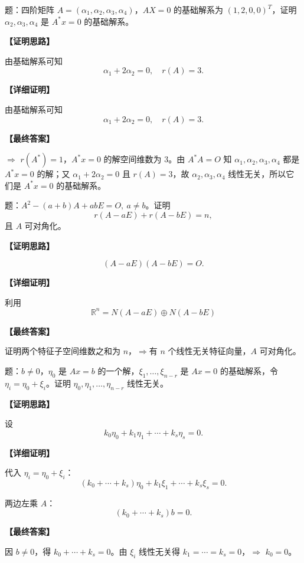 ﻿\documentclass[11pt,a4paper,UTF8]{ctexart}
\begin{document}
\begin{answerbox}
题：四阶矩阵 $A=(\alpha_1,\alpha_2,\alpha_3,\alpha_4)$，$AX=0$ 的基础解系为 $(1,2,0,0)^T$，证明 $\alpha_2,\alpha_3,\alpha_4$ 是 $A^*x=0$ 的基础解系。

\textbf{【证明思路】}

由基础解系可知
\[\alpha_1+2\alpha_2=0,\quad r(A)=3.\]

\textbf{【详细证明】}

由基础解系可知
\[\alpha_1+2\alpha_2=0,\quad r(A)=3.\]

\textbf{【最终答案】}

$\Rightarrow$ $r(A^*)=1$，$A^*x=0$ 的解空间维数为 $3$。由 \(A^*A=O\) 知 \(\alpha_1,\alpha_2,\alpha_3,\alpha_4\) 都是 \(A^*x=0\) 的解；又 \(\alpha_1+2\alpha_2=0\) 且 \(r(A)=3\)，故 \(\alpha_2,\alpha_3,\alpha_4\) 线性无关，所以它们是 \(A^*x=0\) 的基础解系。
\end{answerbox}
\begin{answerbox}
题：$A^2-(a+b)A+abE=O,\ a\ne b$。证明
\[r(A-aE)+r(A-bE)=n,\]
且 $A$ 可对角化。

\textbf{【证明思路】}

\[(A-aE)(A-bE)=O.\]

\textbf{【详细证明】}

利用
\[\mathbb R^n=N(A-aE)\oplus N(A-bE)\]

\textbf{【最终答案】}

证明两个特征子空间维数之和为 $n$，$\Rightarrow$有 $n$ 个线性无关特征向量，$A$ 可对角化。
\end{answerbox}
\begin{answerbox}
题：$b\ne0$，$\eta_0$ 是 $Ax=b$ 的一个解，$\xi_1,\ldots,\xi_{n-r}$ 是 $Ax=0$ 的基础解系，令 $\eta_i=\eta_0+\xi_i$。证明 $\eta_0,\eta_1,\ldots,\eta_{n-r}$ 线性无关。

\textbf{【证明思路】}

设
\[k_0\eta_0+k_1\eta_1+\cdots+k_s\eta_s=0.\]

\textbf{【详细证明】}

代入 $\eta_i=\eta_0+\xi_i$：
\[(k_0+\cdots+k_s)\eta_0+k_1\xi_1+\cdots+k_s\xi_s=0.\]

两边左乘 $A$：
\[(k_0+\cdots+k_s)b=0.\]

\textbf{【最终答案】}

因 $b\ne0$，得 $k_0+\cdots+k_s=0$。由 $\xi_i$ 线性无关得 $k_1=\cdots=k_s=0$，$\Rightarrow$ $k_0=0$。
\end{answerbox}
\end{document}
